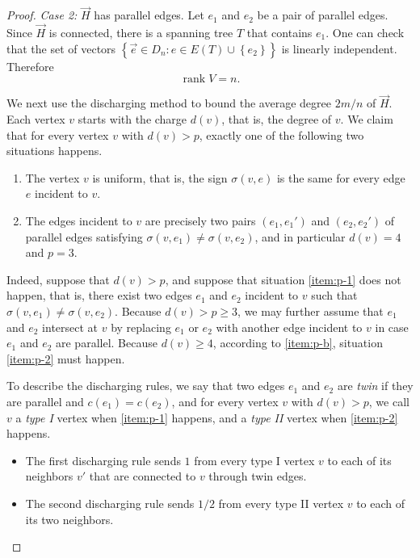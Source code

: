 \documentclass[11pt]{article}
\theoremstyle{definition}
\theoremstyle{remark}
\DeclareMathOperator{\rank}{rank}
\newcommand{\dset}[2]{\left\{{#1}\colon{#2}\right\}}
\newcommand{\sset}[1]{\left\{{#1}\right\}}
\begin{document}
\begin{proof}
    \bigskip
    \noindent\textit{Case 2:} $\vec{H}$ has parallel edges. Let $e_1$ and $e_2$ be a pair of parallel edges. Since $\vec{H}$ is connected, there is a spanning tree $T$ that contains $e_1$. One can check that the set of vectors $\dset{\vec{e} \in D_n}{e \in E(T) \cup \sset{e_2}}$ is linearly independent. Therefore
    \[
        \rank V = n.
    \]

    We next use the discharging method to bound the average degree $2m / n$ of $\vec{H}$. Each vertex $v$ starts with the charge $d(v)$, that is, the degree of $v$. We claim that for every vertex $v$ with $d(v) > p$, exactly one of the following two situations happens.
    \begin{enumerate}[label=(\Roman*)]
        \item The vertex $v$ is uniform, that is, the sign $\sigma(v, e)$ is the same for every edge $e$ incident to $v$. \label{item:p-1}
        \item The edges incident to $v$ are precisely two pairs $(e_1, e_1')$ and $(e_2, e_2')$ of parallel edges satisfying $\sigma(v, e_1) \neq \sigma(v, e_2)$, and in particular $d(v) = 4$ and $p = 3$. \label{item:p-2}
    \end{enumerate}
    Indeed, suppose that $d(v) > p$, and suppose that situation \ref{item:p-1} does not happen, that is, there exist two edges $e_1$ and $e_2$ incident to $v$ such that $\sigma(v, e_1) \neq \sigma(v, e_2)$. Because $d(v) > p \ge 3$, we may further assume that $e_1$ and $e_2$ intersect at $v$ by replacing $e_1$ or $e_2$ with another edge incident to $v$ in case $e_1$ and $e_2$ are parallel. Because $d(v) \ge 4$, according to \ref{item:p-b}, situation \ref{item:p-2} must happen.

    To describe the discharging rules, we say that two edges $e_1$ and $e_2$ are \emph{twin} if they are parallel and $c(e_1) = c(e_2)$, and for every vertex $v$ with $d(v) > p$, we call $v$ a \emph{type I} vertex when \ref{item:p-1} happens, and a \emph{type II} vertex when \ref{item:p-2} happens.
    
    \begin{itemize}
        \item The first discharging rule sends $1$ from every type I vertex $v$ to each of its neighbors $v'$ that are connected to $v$ through twin edges.
        \item The second discharging rule sends $1/2$ from every type II vertex $v$ to each of its two neighbors.
    \end{itemize}


\end{proof}
\end{document}
